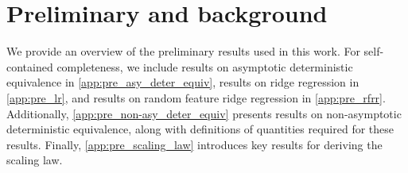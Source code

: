 \section{Preliminary and background}
\label{app:pre_result}

We provide an overview of the preliminary results used in this work. For self-contained completeness, we include results on asymptotic deterministic equivalence in \cref{app:pre_asy_deter_equiv}, results on ridge regression in \cref{app:pre_lr}, and results on random feature ridge regression in \cref{app:pre_rfrr}. Additionally, \cref{app:pre_non-asy_deter_equiv} presents results on non-asymptotic deterministic equivalence, along with definitions of quantities required for these results. Finally, \cref{app:pre_scaling_law} introduces key results for deriving the scaling law.
















